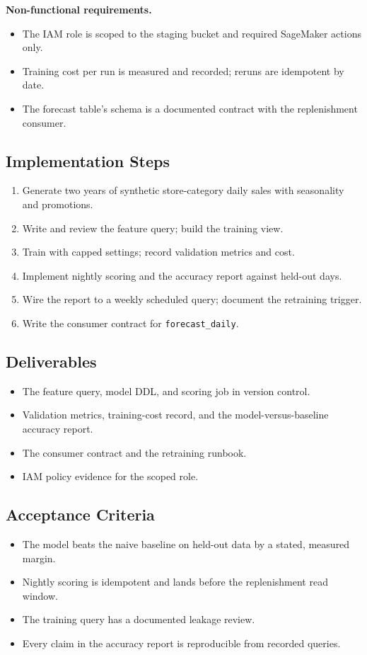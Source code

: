 \textbf{Non-functional requirements.}
\begin{itemize}
    \item The IAM role is scoped to the staging bucket and required SageMaker actions only.
    \item Training cost per run is measured and recorded; reruns are idempotent by date.
    \item The forecast table's schema is a documented contract with the replenishment consumer.
\end{itemize}

\subsection*{Implementation Steps}
\begin{enumerate}
    \item Generate two years of synthetic store-category daily sales with seasonality and promotions.
    \item Write and review the feature query; build the training view.
    \item Train with capped settings; record validation metrics and cost.
    \item Implement nightly scoring and the accuracy report against held-out days.
    \item Wire the report to a weekly scheduled query; document the retraining trigger.
    \item Write the consumer contract for \texttt{forecast\_daily}.
\end{enumerate}

\subsection*{Deliverables}
\begin{itemize}
    \item The feature query, model DDL, and scoring job in version control.
    \item Validation metrics, training-cost record, and the model-versus-baseline accuracy report.
    \item The consumer contract and the retraining runbook.
    \item IAM policy evidence for the scoped role.
\end{itemize}

\subsection*{Acceptance Criteria}
\begin{itemize}
    \item The model beats the naive baseline on held-out data by a stated, measured margin.
    \item Nightly scoring is idempotent and lands before the replenishment read window.
    \item The training query has a documented leakage review.
    \item Every claim in the accuracy report is reproducible from recorded queries.
\end{itemize}


